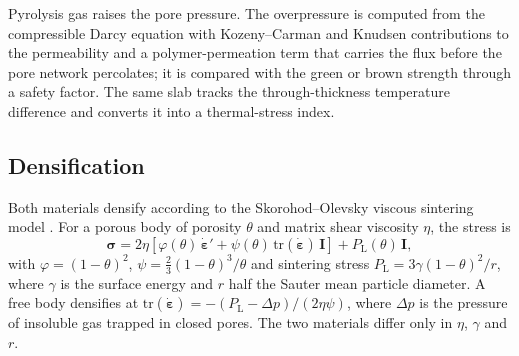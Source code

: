 Pyrolysis gas raises the pore pressure. The overpressure is computed from the compressible Darcy equation with Kozeny--Carman and Knudsen contributions to the permeability and a polymer-permeation term that carries the flux before the pore network percolates; it is compared with the green or brown strength through a safety factor. The same slab tracks the through-thickness temperature difference and converts it into a thermal-stress index.

\subsection{Densification}
\label{sec:densification}

Both materials densify according to the Skorohod--Olevsky viscous sintering model \cite{olevsky1998theory}. For a porous body of porosity $\theta$ and matrix shear viscosity $\eta$, the stress is
\begin{equation}
\boldsymbol{\sigma} = 2\eta\left[\varphi(\theta)\,\dot{\boldsymbol{\varepsilon}}' + \psi(\theta)\,\mathrm{tr}(\dot{\boldsymbol{\varepsilon}})\,\mathbf{I}\right] + P_{\mathrm{L}}(\theta)\,\mathbf{I},
\label{eq:sovs}
\end{equation}
with $\varphi = (1-\theta)^2$, $\psi = \tfrac{2}{3}(1-\theta)^3/\theta$ and sintering stress $P_{\mathrm{L}} = 3\gamma(1-\theta)^2/r$, where $\gamma$ is the surface energy and $r$ half the Sauter mean particle diameter. A free body densifies at $\mathrm{tr}(\dot{\boldsymbol{\varepsilon}}) = -(P_{\mathrm{L}}-\Delta p)/(2\eta\psi)$, where $\Delta p$ is the pressure of insoluble gas trapped in closed pores. The two materials differ only in $\eta$, $\gamma$ and $r$.

